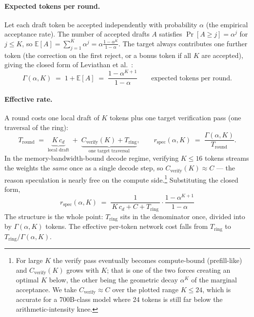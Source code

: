 \documentclass[11pt]{article}
\newcommand{\Tring}{\ensuremath{T_{\mathrm{ring}}}}
\newcommand{\Gam}{\ensuremath{\Gamma}}
\begin{document}
\paragraph{Expected tokens per round.} Let each draft token be accepted independently with
probability $\alpha$ (the empirical acceptance rate). The number of accepted drafts $A$ satisfies
$\Pr[A\ge j]=\alpha^{j}$ for $j\le K$, so
$\mathbb{E}[A]=\sum_{j=1}^{K}\alpha^{j}=\alpha\frac{1-\alpha^{K}}{1-\alpha}$. The target always
contributes one further token (the correction on the first reject, or a bonus token if all $K$ are
accepted), giving the closed form of Leviathan et al.~\cite{leviathan}:
\begin{equation}
\Gam(\alpha,K)\;=\;1+\mathbb{E}[A]\;=\;\frac{1-\alpha^{K+1}}{1-\alpha}
\qquad\text{expected tokens per round.}
\label{eq:gamma}
\end{equation}

\paragraph{Effective rate.} A round costs one local draft of $K$ tokens plus one target
verification pass (one traversal of the ring):
\begin{equation}
T_{\mathrm{round}} \;=\; \underbrace{K\,c_d}_{\text{local draft}}
\;+\; \underbrace{C_{\mathrm{verify}}(K) + \Tring}_{\text{one target traversal}},
\qquad
r_{\mathrm{spec}}(\alpha,K)\;=\;\frac{\Gam(\alpha,K)}{T_{\mathrm{round}}}.
\label{eq:rspec}
\end{equation}
In the memory-bandwidth-bound decode regime, verifying $K\!\le\!16$ tokens streams the weights the
\emph{same} once as a single decode step, so $C_{\mathrm{verify}}(K)\approx C$ --- the reason
speculation is nearly free on the compute side.\footnote{For large $K$ the verify pass eventually
becomes compute-bound (prefill-like) and $C_{\mathrm{verify}}(K)$ grows with $K$; that is one of the
two forces creating an optimal $K$ below, the other being the geometric decay $\alpha^{K}$ of the
marginal acceptance. We take $C_{\mathrm{verify}}\!\approx\!C$ over the plotted range $K\le24$, which
is accurate for a 700B-class model where 24 tokens is still far below the arithmetic-intensity
knee.} Substituting the closed form,
\begin{equation}
\boxed{\;
r_{\mathrm{spec}}(\alpha,K)\;=\;\frac{1}{\,K\,c_d + C + \Tring\,}\cdot\frac{1-\alpha^{K+1}}{1-\alpha}
\;}
\label{eq:boxed}
\end{equation}
The structure is the whole point: $\Tring$ sits in the denominator once, divided into by
$\Gam(\alpha,K)$ tokens. The effective per-token network cost falls from $\Tring$ to
$\Tring/\Gam(\alpha,K)$.
\end{document}
